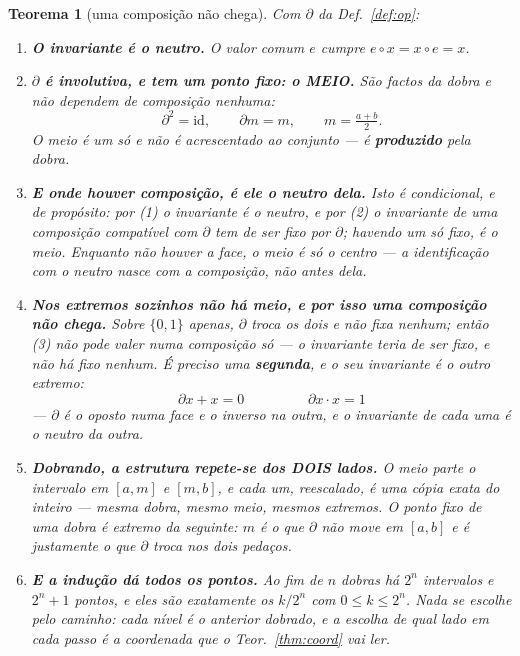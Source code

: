 \documentclass[11pt,a4paper]{article}
\newtheorem{teorema}{Teorema}
\begin{document}
\begin{teorema}[uma composição não chega]\label{thm:duas}
Com $\partial$ da Def.~\ref{def:op}:
\begin{enumerate}\itemsep3pt
\item[(1)] \textbf{O invariante é o neutro.} O valor comum $e$ cumpre
$e\circ x=x\circ e=x$.
\item[(2)] \textbf{$\partial$ é involutiva, e tem um ponto fixo: o MEIO.} São
factos da dobra e não dependem de composição nenhuma:
\[
\partial^{2}=\mathrm{id},\qquad \partial m=m,\qquad m=\tfrac{a+b}{2} .
\]
O meio é \emph{um só} e não é acrescentado ao conjunto --- é \textbf{produzido}
pela dobra.
\item[(3)] \textbf{E onde houver composição, é ele o neutro dela.} Isto é
condicional, e de propósito: por (1) o invariante é o neutro, e por (2) o
invariante de uma composição compatível com $\partial$ tem de ser fixo por
$\partial$; havendo um só fixo, é o meio. \emph{Enquanto não houver a face, o
meio é só o centro} --- a identificação com o neutro nasce com a composição, não
antes dela.
\item[(4)] \textbf{Nos extremos sozinhos não há meio, e por isso uma composição
não chega.} Sobre $\{0,1\}$ apenas, $\partial$ troca os dois e não fixa nenhum;
então (3) não pode valer numa composição só --- o invariante teria de ser fixo,
e não há fixo nenhum. É preciso uma \textbf{segunda}, e o
seu invariante é o \emph{outro} extremo:
\[
\boxed{\;\partial x + x = 0\;}\qquad\qquad\boxed{\;\partial x\cdot x = 1\;}
\]
--- $\partial$ é o \emph{oposto} numa face e o \emph{inverso} na outra, e o
invariante de cada uma é o neutro da outra.
\item[(5)] \textbf{Dobrando, a estrutura repete-se dos DOIS lados.} O meio parte
o intervalo em $[a,m]$ e $[m,b]$, e cada um, reescalado, é uma cópia exata do
inteiro --- mesma dobra, mesmo meio, mesmos extremos. \emph{O ponto fixo de uma
dobra é extremo da seguinte}: $m$ é o que $\partial$ não move em $[a,b]$ e é
justamente o que $\partial$ \emph{troca} nos dois pedaços.
\item[(6)] \textbf{E a indução dá todos os pontos.} Ao fim de $n$ dobras há
$2^{n}$ intervalos e $2^{n}+1$ pontos, e eles são exatamente os $k/2^{n}$ com
$0\le k\le 2^{n}$. Nada se escolhe pelo caminho: cada nível é o anterior
dobrado, e a escolha de \emph{qual lado} em cada passo é a coordenada que o
Teor.~\ref{thm:coord} vai ler.
\end{enumerate}
\end{teorema}
\end{document}
